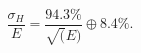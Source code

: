 \begin{equation}
\frac{\sigma_H}{E} = \frac{94.3\%}{\sqrt(E)} \oplus 8.4\%.
\label{equ:energy-resolution-hcal}
\end{equation}


